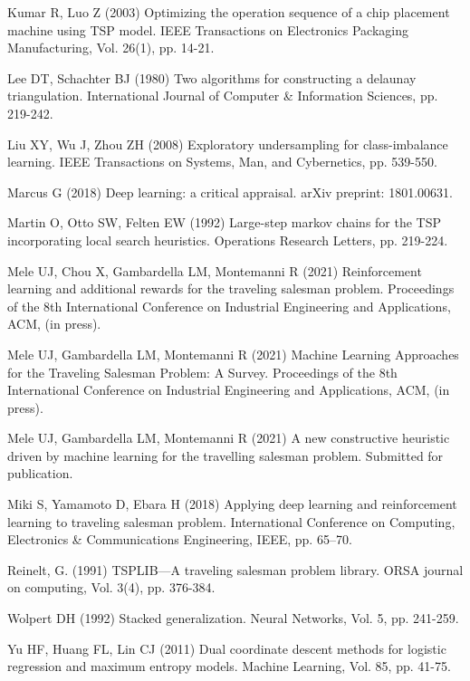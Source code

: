\documentclass{article}
\begin{document}
\begin{thebibliography}{99}
Kumar R, Luo Z (2003)
\newblock Optimizing the operation sequence of a chip placement machine using TSP model.
\newblock IEEE Transactions on Electronics Packaging Manufacturing, Vol. 26(1), pp. 14-21.


Lee DT, Schachter BJ (1980)
\newblock Two algorithms for constructing a delaunay triangulation.
\newblock International Journal of Computer \& Information Sciences, pp. 219-242.

Liu XY, Wu J, Zhou ZH (2008)
\newblock Exploratory undersampling for class-imbalance learning.
\newblock IEEE Transactions on Systems, Man, and Cybernetics, pp. 539-550.

Marcus G (2018)
\newblock Deep learning: a critical appraisal.
\newblock arXiv preprint: 1801.00631.

Martin O, Otto SW, Felten EW (1992)
\newblock Large-step markov chains for the TSP incorporating local search heuristics.
\newblock Operations Research Letters, pp. 219-224.

Mele UJ, Chou X, Gambardella LM, Montemanni R (2021)
\newblock Reinforcement learning and additional rewards for the traveling salesman problem.
\newblock Proceedings of the 8th International Conference on Industrial Engineering and Applications, ACM, (in press).

Mele UJ, Gambardella LM, Montemanni R (2021)
\newblock Machine Learning Approaches for the Traveling Salesman Problem: A Survey.
\newblock Proceedings of the 8th International Conference on Industrial Engineering and Applications, ACM, (in press).

Mele UJ, Gambardella LM, Montemanni R (2021)
\newblock A new constructive heuristic driven by machine learning for the travelling salesman problem.
\newblock Submitted for publication.

Miki S, Yamamoto D, Ebara H (2018)
\newblock Applying deep learning and reinforcement learning to traveling salesman problem.
\newblock International Conference on Computing, Electronics \& Communications Engineering, IEEE, pp. 65–70.



Reinelt, G. (1991)
\newblock TSPLIB—A traveling salesman problem library.
\newblock ORSA journal on computing, Vol. 3(4), pp. 376-384.


Wolpert DH (1992)
\newblock Stacked generalization.
\newblock Neural Networks, Vol. 5, pp. 241-259. 


Yu HF, Huang FL, Lin CJ (2011)
\newblock Dual coordinate descent methods for logistic regression and maximum entropy models.
\newblock Machine Learning, Vol. 85, pp. 41-75.





\end{thebibliography}
\end{document}
